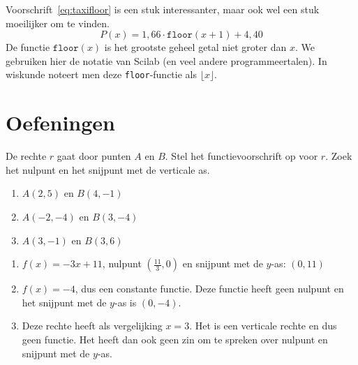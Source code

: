Voorschrift~\eqref{eq:taxifloor} is een stuk interessanter, maar ook wel een stuk moeilijker om te vinden.
\begin{equation}\label{eq:taxifloor}
P(x)= 1,66\cdot \mathtt{floor}(x+1)+4,40
\end{equation}
De functie $\mathtt{floor}(x)$ is het grootste geheel getal niet groter dan $x$. We gebruiken hier de notatie van Scilab (en veel andere programmeertalen). In wiskunde noteert men deze \verb+floor+-functie als $\lfloor x \rfloor$.

\section{Oefeningen}
\begin{oef}
De rechte $r$ gaat door punten $A$ en $B$. Stel het functievoorschrift op voor $r$. Zoek het nulpunt en het snijpunt met de verticale as.
\begin{enumerate}
\item $A(2,5)$ en $B(4,-1)$
\item $A(-2,-4)$ en $B(3,-4)$
\item $A(3,-1)$ en $B(3,6)$ 
\end{enumerate}
     \begin{opl}
\begin{enumerate}
\item $f(x)=-3x+11$, nulpunt $(\frac{11}{3}, 0)$ en snijpunt met de $y$-as: $(0,11)$
\item $f(x)=-4$, dus een constante functie. Deze functie heeft geen nulpunt en het snijpunt met de $y$-as is $(0,-4)$.
\item Deze rechte heeft als vergelijking $x=3$. Het is een verticale rechte en dus geen functie. Het heeft dan ook geen zin om te spreken over nulpunt en snijpunt met de $y$-as.
\end{enumerate}
     \end{opl}
\end{oef}

